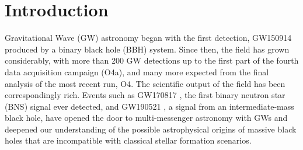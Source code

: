 \documentclass[aps,prd,twocolumn,superscriptaddress,nofootinbib, longbibliography]{revtex4-2}
\begin{document}
\maketitle

\section{Introduction} \label{sec:intro}

	Gravitational Wave (GW) astronomy began with the first detection, GW150914 \citep{gw150914} produced by a binary black hole (BBH) system. Since then, the field has grown considerably, with more than 200 GW detections \cite{gwtc1, gwtc2, gwtc2p1, gwtc3, gwtc4} up to the first part of the fourth data acquisition campaign (O4a), and many more expected from the final analysis of the most recent run, O4. The scientific output of the field has been correspondingly rich. Events such as GW170817 \cite{gw170817}, the first binary neutron star (BNS) signal ever detected, and GW190521 \cite{gw190521_discovery}, a signal from an intermediate-mass black hole, have opened the door to multi-messenger astronomy with GWs and deepened our understanding of the possible astrophysical origins of massive black holes \cite{gw190521_API} that are incompatible with classical stellar formation scenarios. 
	
\end{document}
